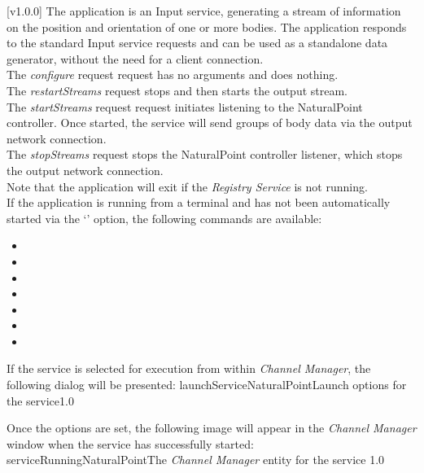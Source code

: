 [v1.0.0]
The  application is an Input service,
generating a stream of information on the position and orientation of one or more bodies.
The application responds to the standard Input service requests and can be used as a
standalone data generator, without the need for a client connection.\\

The \emph{configure} request request has no arguments and does nothing.\\

The \emph{restartStreams} request stops and then starts the output stream.\\

The \emph{startStreams} request request initiates listening to the NaturalPoint
controller.
Once started, the service will send groups of body data via the output \yarp{} network
connection.\\

The \emph{stopStreams} request stops the NaturalPoint controller listener, which stops the
output \yarp{} network connection.\\ 

Note that the application will exit if the \emph{Registry Service} is not running.
\insertAppParameters
\insertTagDescription{\NPI}
\insertInputServiceComment\\

If the application is running from a terminal and has not been automatically started via
the `' option, the following commands are available:
\begin{itemize}
\item{}
\item\exSp{}
\item\exSp{}
\item\exSp{}
\item\exSp{}
\item\exSp{}
\item\exSp{}
\end{itemize}
\secondaryEnd
\condPage
{}
If the service is selected for execution from within \emph{Channel Manager}, the following
dialog will be presented:
%
{launchServiceNaturalPoint}{Launch options for the \NPI{} service}{1.0}

Once the options are set, the following image will appear in the \emph{Channel Manager}
window when the service has successfully started:
%
{serviceRunningNaturalPoint}{The \emph{Channel Manager} entity for the \NPI{} service}%
{1.0}
\secondaryEnd
\primaryEnd{}
